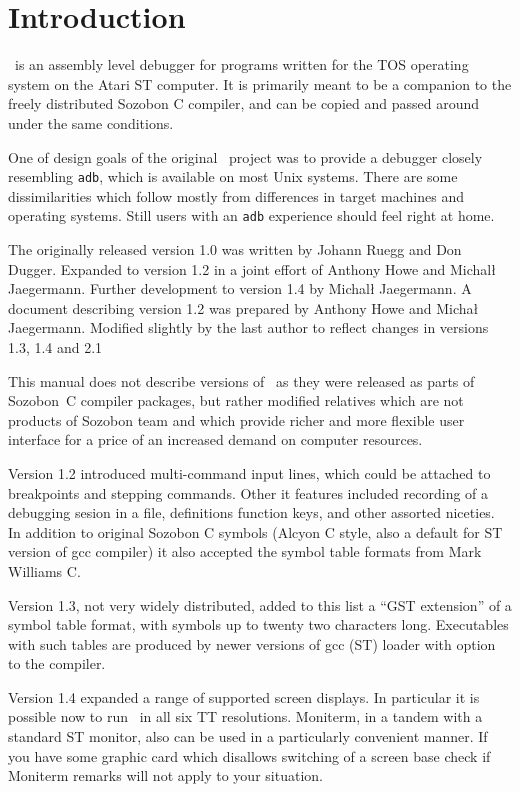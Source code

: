 \section{Introduction}

\szadb\ is an assembly level debugger for programs written for the TOS 
operating system on the Atari ST computer.
It is primarily meant to be a companion
to the freely distributed Sozobon C compiler, and can be copied and passed
around under the same conditions.

One of design goals of the original \szadb\ project was to provide 
a debugger closely resembling {\tt adb},
which is available on most {\sc Unix} systems. There are some dissimilarities
which follow mostly from differences in target machines
and operating systems. Still users with an {\tt adb} experience should feel
right at home.

The originally released version 1.0 was written by Johann Ruegg and Don Dugger.
Expanded to version 1.2 in a joint effort of Anthony Howe and Michal{\l}
Jaegermann.  Further development to version 1.4 by Michal{\l} Jaegermann.
A document describing version 1.2 was prepared by Anthony Howe and
Micha{\l} Jaegermann.  Modified slightly by the last author to reflect
changes in versions 1.3, 1.4 and 2.1

This manual does not describe versions of \szadb\ as they were
released as parts of Sozobon~C compiler packages, but rather modified
relatives which are not products of Sozobon team and which provide
richer and more flexible user interface for a price of an increased
demand on computer resources.

Version 1.2 introduced multi-command input lines,
which could be attached to breakpoints and stepping commands.
Other it features included recording of 
a debugging sesion in a file, definitions 
function keys, and other assorted niceties.
In addition to original Sozobon C symbols
(Alcyon C style, also a default for ST version of gcc compiler)
it also accepted the symbol table formats from Mark Williams C.

Version 1.3, not very widely distributed, added to this list
a ``GST extension'' of a symbol table format, with
symbols up to twenty two characters long.
Executables with such tables are produced by
newer versions of gcc (ST) loader with  option to the
compiler.

Version 1.4 expanded a range of supported screen displays.
In particular it is possible now to run \szadb\ in all six TT resolutions.
Moniterm, in a tandem with a standard ST monitor, also can be used
in a particularly convenient manner.  If you have some graphic
card which disallows switching of a screen base check if Moniterm
remarks will not apply to your situation.

